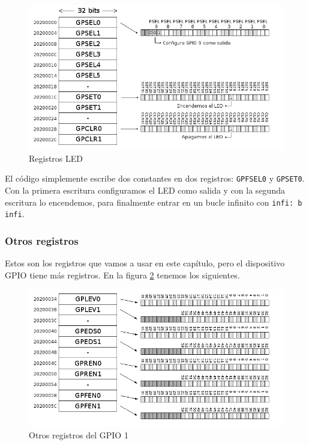 \begin{figure}[h]
  \centering
    \includegraphics[width=14cm]{graphs/gpio1.png}
  \caption{Registros LED}
  \label{fig:gpio1}
\end{figure}

El código simplemente escribe dos constantes en dos registros: {\tt GPFSEL0} y {\tt GPSET0}.
Con la primera escritura configuramos el LED como salida y con la segunda escritura lo
encendemos, para finalmente entrar en un bucle infinito con {\tt infi: b infi}.

\subsubsection{Otros registros}

Estos son los registros que vamos a usar en este capítulo, pero el dispositivo GPIO tiene
más registros. En la figura \ref{fig:gpio2} tenemos los siguientes.

\begin{figure}[h]
  \centering
    \includegraphics[width=14cm]{graphs/gpio2.png}
  \caption{Otros registros del GPIO 1}
  \label{fig:gpio2}
\end{figure}

